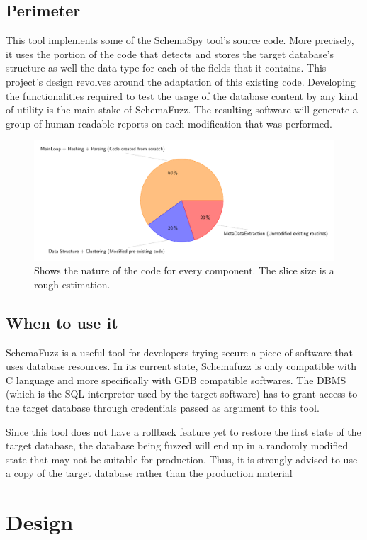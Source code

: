 \documentclass{article}
\begin{document}
\begin{empfile}
		\subsection{Perimeter}
This tool implements some of the SchemaSpy tool's source code. More precisely, it uses the portion of the code that detects and stores the target database's structure as well the data type for each of the fields that it contains. This project's design revolves around the adaptation of this existing code. Developing the functionalities required to test the usage of the database content by any kind of utility is the main stake of SchemaFuzz.  		
The resulting software will generate a group of human readable reports on each modification that was performed.		
		\begin{figure} [h!]
		\includegraphics[width=\textwidth]{codeOriginDiagram.pdf}
		\caption{Shows the nature of the code for every component. The slice size is a rough estimation.}
		\end{figure}
		\subsection{When to use it}
SchemaFuzz is a useful tool for developers trying secure a piece of software that uses database resources. In its current state, Schemafuzz is only compatible with C language and more specifically with GDB compatible softwares. The DBMS (which is the SQL interpretor used by the target software) has to grant access to the target database through credentials passed as argument to this tool.

Since this tool does not have a rollback feature yet to restore the first state of the target database, the database being fuzzed will end up in a randomly modified state that may not be suitable for production. Thus, it is strongly advised to use a copy of the target database rather than the production material
		\clearpage

	\section{Design}

\end{empfile}
\end{document}
